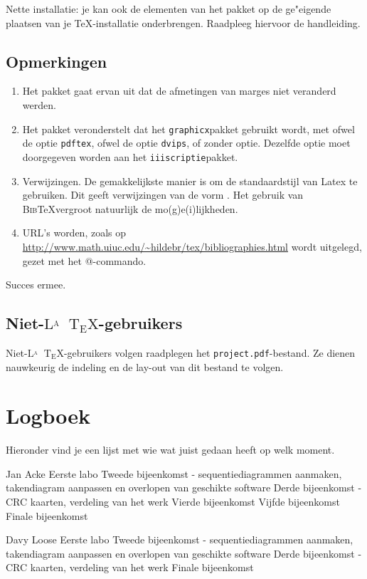 \documentclass[a4paper,oneside]{report}
\def\latex{$\mathrm{L\!\!^{{}_{\scriptstyle A}} \!\!\!\!\!\;\; T\!_{\displaystyle E} \!
X}$}
\begin{document}
Nette installatie: je kan ook de elementen van het pakket op de ge"eigende plaatsen van
je \TeX-installatie onderbrengen. Raadpleeg hiervoor de handleiding.
\section{Opmerkingen}
\begin{enumerate}
\item Het pakket gaat ervan uit dat de afmetingen van marges niet veranderd werden.
\item Het pakket veronderstelt dat het {\tt graphicx}pakket gebruikt wordt, met ofwel de
optie {\tt pdftex}, ofwel de optie {\tt dvips}, of zonder optie. Dezelfde optie moet doorgegeven worden
aan het {\tt iiiscriptie}pakket.
\item Verwijzingen.
De gemakkelijkste manier is om de standaardstijl van Latex te gebruiken. Dit geeft 
verwijzingen van de vorm \cite{Mmils}.
Het gebruik van \textsc{Bib}\TeX vergroot natuurlijk de mo(g)e(i)lijkheden.
\item URL's worden, zoals op \url{http://www.math.uiuc.edu/~hildebr/tex/bibliographies.html}
wordt uitgelegd, gezet met het \verb@\url{}@-commando.
\end{enumerate}
Succes ermee.
\section{Niet-\latex-gebruikers}
Niet-\latex-gebruikers volgen raadplegen het {\tt project.pdf}-bestand. Ze
dienen nauwkeurig de indeling en de lay-out van dit bestand te volgen.

\chapter{Logboek}
Hieronder vind je een lijst met wie wat juist gedaan heeft op welk moment.
\begin{studentlog}{Jan Acke}
{Eerste labo}
{Tweede bijeenkomst - sequentiediagrammen aanmaken, takendiagram aanpassen en overlopen van geschikte software}
{Derde bijeenkomst - CRC kaarten, verdeling van het werk}
{Vierde bijeenkomst}
{Vijfde bijeenkomst}
{Finale bijeenkomst}
\end{studentlog}

\begin{studentlog}{Davy Loose}
{Eerste labo}
{Tweede bijeenkomst - sequentiediagrammen aanmaken, takendiagram aanpassen en overlopen van geschikte software}
{Derde bijeenkomst - CRC kaarten, verdeling van het werk}
{Finale bijeenkomst}
\end{studentlog}
\end{document}
